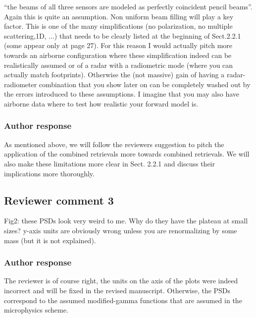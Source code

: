 \documentclass[11pt]{scrartcl}
\begin{document}
 “the beams of all three sensors are modeled as perfectly coincident pencil
beams”. Again this is quite an assumption. Non uniform beam filling will play a
key factor. This is one of the many simplifications (no polarization, no multiple
scattering,1D, ...) that needs to be clearly listed at the beginning of
Sect.2.2.1 (some appear only at page 27). For this reason I would actually pitch
more towards an airborne configuration where these simplification indeed can
be realistically assumed or of a radar with a radiometric mode (where you can
actually match footprints). Otherwise the (not massive) gain of having a
radar-radiometer combination that you show later on can be completely washed
out by the errors introduced to these assumptions. I imagine that you may also
have airborne data where to test how realistic your forward model is.

\subsubsection*{Author response}


As mentioned above, we will follow the reviewers suggestion to pitch the application
of the combined retrievals more towards combined retrievals. We will also make these
limitations more clear in Sect. 2.2.1 and discuss their implications more thoroughly.

\subsection*{Reviewer comment 3}
Fig2: these PSDs look very weird to me. Why do they have the plateau at small
sizes? y-axis units are obviously wrong unless you are renormalizing by some mass
(but it is not explained).

\subsubsection*{Author response}

The reviewer is of course right, the units on the axis of the plots were indeed
incorrect and will be fixed in the revised manuscript. Otherwise, the PSDs
correspond to the assumed modified-gamma functions that are assumed in the
\cite{milbrandtyau05} microphysics scheme.
\end{document}
